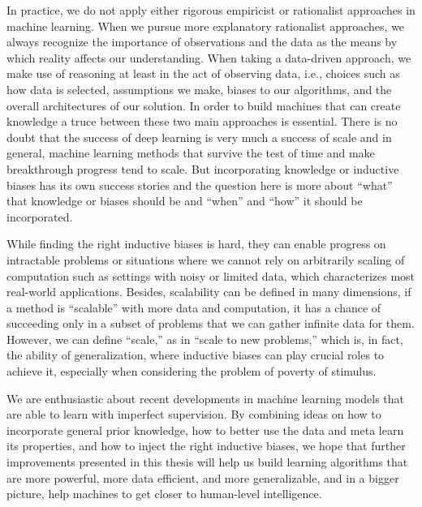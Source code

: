 In practice, we do not apply either rigorous empiricist or rationalist approaches in machine learning.  When we pursue more explanatory rationalist approaches, we always recognize the importance of observations and the data as the means by which reality affects our understanding.  When taking a data-driven approach, we make use of reasoning at least in the act of observing data, i.e., choices such as how data is selected, assumptions we make, biases to our algorithms, and the overall architectures of our solution.
%
In order to build machines that can create knowledge a truce between these two main approaches is essential.
There is no doubt that the success of deep learning is very much a success of scale and in general, machine learning methods that survive the test of time and make breakthrough progress tend to scale.
But incorporating knowledge or inductive biases has its own success stories and the question here is more about ``what'' that knowledge or biases should be and ``when'' and ``how'' it should be incorporated. 

While finding the right inductive biases is hard, they can enable progress on intractable problems or situations where we cannot rely on arbitrarily scaling of computation such as settings with noisy or limited data, which characterizes most real-world applications. 
Besides, scalability can be defined in many dimensions, if a method is ``scalable'' with more data and computation, it has a chance of succeeding only in a subset of problems that we can gather infinite data for them. 
However, we can define ``scale,'' as in ``scale to new problems,'' which is, in fact, the ability of generalization, where inductive biases can play crucial roles to achieve it, especially when considering the problem of poverty of stimulus.


\bigskip
We are enthusiastic about recent developments in machine learning models that are able to learn with imperfect supervision. 
By combining ideas on how to incorporate general prior knowledge, how to better use the data and meta learn its properties, and how to inject the right inductive biases, we hope that further improvements presented in this thesis will help us build learning algorithms that are more powerful, more data efficient, and more generalizable, and in a bigger picture, help machines to get closer to human-level intelligence. 
